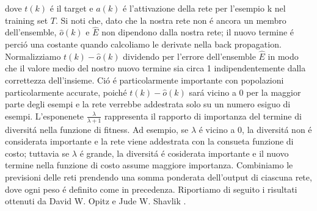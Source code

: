 \documentclass[a4paper,10pt]{article}
\begin{document}
  dove $t(k)$ \'e il target e $a(k)$ \'e l'attivazione della rete per l'esempio k nel training set $T$. Si noti che, dato che la nostra rete non \'e ancora un membro dell'ensemble, $\widehat{o} (k)$ e $\widehat{E}$ non dipendono dalla nostra rete; il nuovo termine \'e perci\'o una costante quando calcoliamo le derivate nella back propagation. Normalizziamo $t(k) - \widehat{o} (k)$ dividendo per l'errore dell'ensemble $\widehat{E}$ in modo che il valore medio del nostro nuovo termine sia circa 1 indipendentemente dalla correttezza dell'insieme. Ci\'o \'e particolarmente importante con popolazioni particolarmente accurate, poich\'e $t(k) - \widehat{o} (k)$ sar\'a vicino a 0 per la maggior parte degli esempi e la rete verrebbe addestrata solo su un numero esiguo di esempi. L'esponenete $\frac{\lambda}{\lambda + 1}$ rappresenta il rapporto di importanza del termine di diversit\'a nella funzione di fitness. Ad esempio, se $\lambda$ \'e vicino a 0, la diversit\'a non \'e considerata importante e la rete viene addestrata con la consueta funzione di costo; tuttavia se $\lambda$ \'e grande, la diversit\'a \'e cosiderata importante e il nuovo termine nella funzione di costo assume maggiore importanza. Combiniamo le previsioni delle reti prendendo una somma ponderata dell'output di ciascuna rete, dove ogni peso \'e definito come in precedenza. Riportiamo di seguito i risultati ottenuti da David W. Opitz e Jude W. Shavlik \cite{opitz1994using}.
\end{document}
